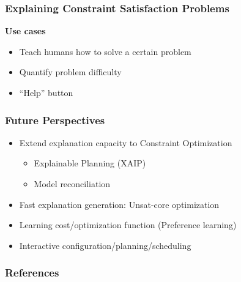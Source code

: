 \documentclass{beamer}
\begin{document}
\begin{frame}
    \frametitle{\small{Explaining Constraint Satisfaction Problems}}
    \textbf{Use cases}
    \begin{itemize}
        \item Teach humans how to solve a certain problem
        \item Quantify problem difficulty
        \item “Help” button
    \end{itemize}

\end{frame}

\begin{frame}
    \frametitle{\small{Future Perspectives}}

    \begin{itemize}
        \item Extend explanation capacity to Constraint Optimization
        \begin{itemize}
            \item Explainable Planning (XAIP)
            \item Model reconciliation    \pause     
        \end{itemize}
        \item Fast explanation generation: Unsat-core optimization\pause
        \item Learning cost/optimization function (Preference learning)\pause
        \item Interactive configuration/planning/scheduling
    \end{itemize}

\end{frame}


\begin{frame}
    \frametitle{References}
    \vspace{2em}
    
\end{frame}
\end{document}
